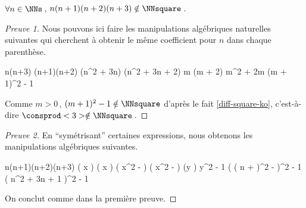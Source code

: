 \begin{fact} \label{case-4}
	 $\forall n \in \NNs$\,, $n(n+1)(n+2)(n+3) \notin \NNsquare$\,.
\end{fact}




\begin{proof}[Preuve 1]
    Nous pouvons ici faire les manipulations algébriques naturelles suivantes qui cherchent à obtenir le même coefficient pour $n$ dans chaque parenthèse.
    
    \medskip
    
    \begin{stepcalc}[style = sar]
    \explnext{}
    	n(n+3) \cdot (n+1)(n+2)
    \explnext{}
    	(n^2 + 3n) \cdot (n^2 + 3n + 2)
    	m (m + 2)
    \explnext{}
    	m^2 + 2m
    \explnext{}
    	(m + 1)^2 - 1
    \end{stepcalc}
    
    \medskip
    
    Comme $m > 0$\,, $(m + 1)^2 - 1 \notin \NNsquare$ d'après le fait \ref{diff-square-ko}, c'est-à-dire $\consprod<3> \notin \NNsquare$\,. 
\end{proof}




\begin{proof}[Preuve 2]
	En \enquote{symétrisant} certaines expressions, nous obtenons les manipulations algébriques suivantes.
    
    \medskip
    
    \begin{stepcalc}[style = sar]
    \explnext{}
    	n(n+1)(n+2)(n+3)
    	\big( x \pm {} \big) \big( x \pm {} \big)
    \explnext{}
    	\big( x^2 -  \big) \big( x^2 -  \big)
    	(y )
    \explnext{}
    	y^2 - 1
    \explnext{}
    	\Big( \big( n +  \big)^2 -  \Big)^2 - 1
    \explnext{}
    	\big( n^2 + 3n + 1 \big)^2 - 1
    \end{stepcalc}
    
    \medskip
    
    On conclut comme dans la première preuve.
\end{proof}

